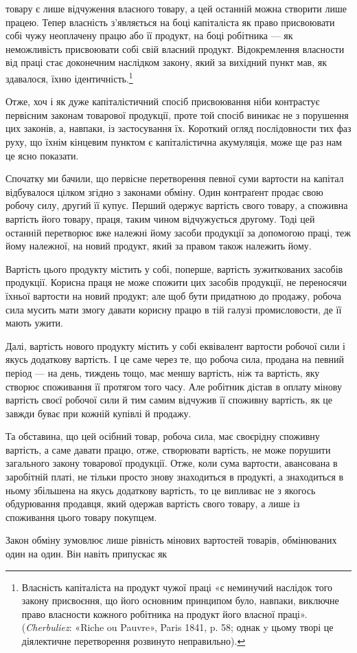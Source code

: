 \parcont{}  %
товару є лише відчуження власного товару, а цей останній можна
створити лише працею. Тепер власність з’являється на боці
капіталіста як право присвоювати собі чужу неоплачену працю
або її продукт, на боці робітника — як неможливість присвоювати
собі свій власний продукт. Відокремлення власности від
праці стає доконечним наслідком закону, який за вихідний пункт
мав, як здавалося, їхню ідентичність.\footnote{
Власність капіталіста на продукт чужої праці «є неминучий
наслідок того закону присвоєння, що його основним принципом було,
навпаки, виключне право власности кожного робітника на продукт його
власної праці». (\emph{Cherbuliez}: «Riche ou Pauvre», Paris 1841, p. 58; однак
y цьому творі це діялектичне перетворення розвинуто неправильно).
}

Отже, хоч і як дуже капіталістичний спосіб присвоювання
ніби контрастує первісним законам товарової продукції, проте
той спосіб виникає не з порушення цих законів, а, навпаки, із застосування
їх. Короткий огляд послідовности тих фаз руху, що
їхнім кінцевим пунктом є капіталістична акумуляція, може ще
раз нам це ясно показати.

Спочатку ми бачили, що первісне перетворення певної суми
вартости на капітал відбувалося цілком згідно з законами обміну.
Один контраґент продає свою робочу силу, другий її купує.
Перший одержує вартість свого товару, а споживна вартість
його товару, праця, таким чином відчужується другому. Тоді
цей останній перетворює вже належні йому засоби продукції
за допомогою праці, теж йому належної, на новий продукт, який
за правом також належить йому.

Вартість цього продукту містить у собі, поперше, вартість
зужиткованих засобів продукції. Корисна праця не може спожити
цих засобів продукції, не переносячи їхньої вартости на
новий продукт; але щоб бути придатною до продажу, робоча
сила мусить мати змогу давати корисну працю в тій галузі промисловости,
де її мають ужити.

Далі, вартість нового продукту містить у собі еквівалент
вартости робочої сили і якусь додаткову вартість. І це саме через
те, що робоча сила, продана на певний період — на день, тиждень
тощо, має меншу вартість, ніж та вартість, яку створює споживання
її протягом того часу. Але робітник дістав в оплату мінову
вартість своєї робочої сили й тим самим відчужив її споживну
вартість, як це завжди буває при кожній купівлі й продажу.

Та обставина, що цей осібний товар, робоча сила, має своєрідну
споживну вартість, а саме давати працю, отже, створювати
вартість, не може порушити загального закону товарової продукції.
Отже, коли сума вартости, авансована в заробітній платі, не
тільки просто знову знаходиться в продукті, а знаходиться в
ньому збільшена на якусь додаткову вартість, то це випливає
не з якогось обдурювання продавця, який одержав вартість
свого товару, а лише із споживання цього товару покупцем.

Закон обміну зумовлює лише рівність мінових вартостей
товарів, обмінюваних один на один. Він навіть припускає як
\parbreak{}  %

